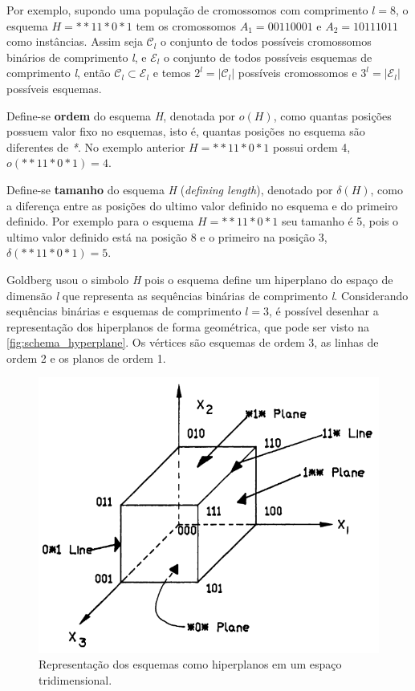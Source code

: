 Por exemplo, supondo uma população de cromossomos com comprimento \(l=8\), o esquema \mbox{\(H=**11*0*1\)} tem os cromossomos \(A_1=00110001\) e \(A_2=10111011\) como instâncias. Assim seja \(\mathcal{C}_l\) o conjunto de todos possíveis cromossomos binários de comprimento \textit{l}, e \(\mathcal{E}_l\) o conjunto de todos possíveis esquemas de comprimento \textit{l}, então \(\mathcal{C}_l \subset \mathcal{E}_l \) e temos \(2^l = |\mathcal{C}_l|\) possíveis cromossomos e \(3^l = |\mathcal{E}_l|\) possíveis esquemas.

Define-se \textbf{ordem} do esquema \textit{H}, denotada por \(o(H)\), como quantas posições possuem valor fixo no esquemas, isto é, quantas posições no esquema são diferentes de \textit{*}. No exemplo anterior \(H=**11*0*1\) possui ordem 4, \(o(**11*0*1) = 4\).

Define-se \textbf{tamanho} do esquema \textit{H} (\textit{defining length}), denotado por \(\delta(H)\), como a diferença entre as posições do ultimo valor definido no esquema e do primeiro definido. Por exemplo para o esquema \(H=**11*0*1\) seu tamanho é 5, pois o ultimo valor definido está na posição 8 e o primeiro na posição 3, \(\delta(**11*0*1) = 5\). 

Goldberg usou o simbolo \textit{H} pois o esquema define um hiperplano do espaço de dimensão \textit{l} que representa as sequências binárias de comprimento \textit{l}. Considerando sequências binárias e esquemas de comprimento \(l=3\), é possível desenhar a representação dos hiperplanos de forma geométrica, que pode ser visto na \autoref{fig:schema_hyperplane}. Os vértices são esquemas de ordem 3, as linhas de ordem 2 e os planos de ordem 1.

\begin{figure}[h!]
	\centering
	\includegraphics[width=0.75\linewidth]{imagens/schema_hyperplane.png}
	\caption{Representação dos esquemas como hiperplanos em um espaço tridimensional. \cite{Goldberg1989}}
	\label{fig:schema_hyperplane}
\end{figure}

